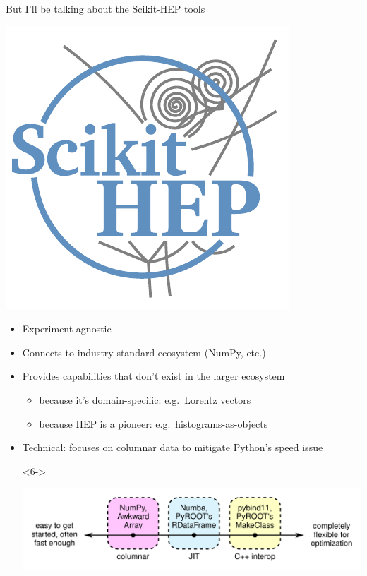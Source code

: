 \documentclass[aspectratio=169]{beamer}
\begin{document}
\begin{frame}{But I'll be talking about the Scikit-HEP tools}
\large

\vspace{0.2 cm}
\hfill \includegraphics[height=3 cm]{scikit-hep-logo.pdf}

\vspace{-2 cm}
\begin{itemize}\setlength{\itemsep}{0.2 cm}
\item<1-> Experiment agnostic
\item<2-> Connects to industry-standard ecosystem (NumPy, etc.)
\item<3-> Provides capabilities that don't exist in the larger ecosystem

\vspace{0.2 cm}
\begin{itemize}\setlength{\itemsep}{0.2 cm}
\item<4-> \normalsize because it's domain-specific: e.g.\ Lorentz vectors
\item<5-> \normalsize because HEP is a pioneer: e.g.\ histograms-as-objects
\end{itemize}

\vspace{0 cm}
\item<6-> Technical: focuses on columnar data to mitigate Python's speed issue

\begin{uncoverenv}<6->
\begin{center}
\includegraphics[width=0.75\linewidth]{ease-vs-flexibility.pdf} \mbox{\hspace{1 cm}}
\end{center}
\end{uncoverenv}
\end{itemize}
\end{frame}
\end{document}
